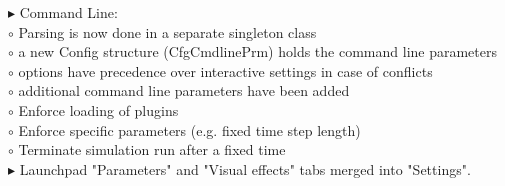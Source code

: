\documentclass[Orbiter User Manual.tex]{subfiles}
\begin{document}
\begin{sloppypar}
$\blacktriangleright$ Command Line:\\
$\circ$ Parsing is now done in a separate singleton class\\
$\circ$ a new Config structure (CfgCmdlinePrm) holds the command line parameters\\
$\circ$ options have precedence over interactive settings in case of conflicts\\
$\circ$ additional command line parameters have been added\\
$\circ$ Enforce loading of plugins\\
$\circ$ Enforce specific parameters (e.g. fixed time step length)\\
$\circ$ Terminate simulation run after a fixed time\\
$\blacktriangleright$ Launchpad "Parameters" and "Visual effects" tabs merged into "Settings".\\
\end{sloppypar}
\end{document}
